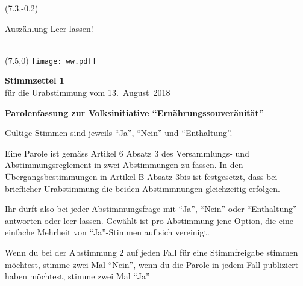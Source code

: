 \documentclass[11pt, a4paper]{scrartcl}
\begin{document}
{\begin{minipage}[t][12.5cm][t]{\textwidth}
\begin{textblock}{6}(7.3,-0.2)
\begin{framed}
Auszählung \hfill Leer lassen! \\
\vspace{1.5cm} ~ \\
\end{framed}
\end{textblock}


\end{minipage}

\newpage

\begin{minipage}[t][12.5cm][t]{17.7cm}

\begin{textblock}{6}(7.5,0)
\texttt{[image: ww.pdf]}
\end{textblock}

{\LARGE\textbf{Stimmzettel 1}} \\
für die Urabstimmung vom 13.~August~2018 \\

\vspace{2cm}

\textbf{Parolenfassung zur Volksinitiative \enquote{Ernährungssouveränität}}

\vspace{0.2cm}
Gültige Stimmen sind jeweils \enquote{Ja}, \enquote{Nein} und \enquote{Enthaltung}.

\vspace{0.2cm}
Eine Parole ist gemäss Artikel 6 Absatz 3 des Versammlungs- und Abstimmungsreglement in zwei Abstimmungen zu fassen. In den Übergangsbestimmungen in Artikel B Absatz 3bis ist festgesetzt, dass bei brieflicher Urabstimmung die beiden Abstimmnungen gleichzeitig erfolgen.

\vspace{0.2cm}
Ihr dürft also bei jeder Abstimmungsfrage mit \enquote{Ja}, \enquote{Nein} oder \enquote{Enthaltung} antworten oder leer lassen. Gewählt ist pro Abstimmung jene Option, die eine einfache Mehrheit von \enquote{Ja}-Stimmen auf sich vereinigt. 

\vspace{0.2cm}
Wenn du bei der Abstimmung 2 auf jeden Fall für eine Stimmfreigabe stimmen möchtest, stimme zwei Mal \enquote{Nein}, wenn du die Parole in jedem Fall publiziert haben möchtest, stimme zwei Mal \enquote{Ja} %


\end{minipage}}
\end{document}
